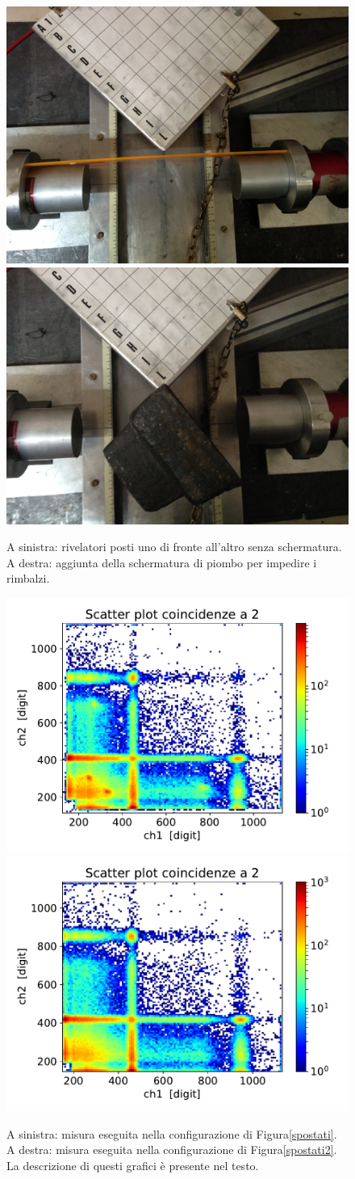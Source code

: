 \begin{figure}[h]
\centering
\subfloat
{\includegraphics[width=17 em]{immagini/alter} \label{spostati} }
\subfloat
{\includegraphics[width=17 em]{immagini/spostati2} \label{spostati2}}
\caption{A sinistra: rivelatori posti uno di fronte all'altro senza schermatura. A destra: aggiunta della schermatura di piombo per impedire i rimbalzi.}
\end{figure}

\begin{figure}[h]
\centering
\hspace{-2.5 cm}
\subfloat
{
\includegraphics[width=21 em]{immagini/0518_rimbalzi}
\label{spostato}
}
\subfloat
{
\includegraphics[width=21 em]{immagini/0518_piombo}
\label{piombo}
}
\caption{A sinistra: misura eseguita nella configurazione di Figura\autoref{spostati}. \\
A destra: misura eseguita nella configurazione di Figura\autoref{spostati2}.  \\
La descrizione di questi grafici è presente nel testo.}

\end{figure}

